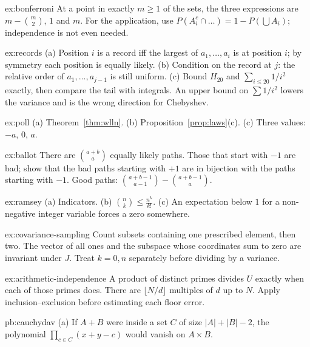 \begin{hint}{ex:bonferroni}
At a point in exactly $m\ge1$ of the sets, the three expressions are $m-\binom m2$, $1$ and $m$. For the application, use $P(A_i^c\cap\dots)=1-P(\bigcup A_i)$; independence is not even needed.
\end{hint}
\begin{hint}{ex:records}
(a) Position $i$ is a record iff the largest of $a_1,\dots,a_i$ is at position $i$; by symmetry each position is equally likely. (b) Condition on the record at $j$: the relative order of $a_1,\dots,a_{j-1}$ is still uniform. (c) Bound $H_{20}$ and $\sum_{i\le20}1/i^2$ exactly, then compare the tail with integrals. An upper bound on $\sum 1/i^2$ lowers the variance and is the wrong direction for Chebyshev.
\end{hint}
\begin{hint}{ex:poll}
(a) Theorem~\ref{thm:wlln}. (b) Proposition~\ref{prop:laws}(c). (c) Three values: $-a$, $0$, $a$.
\end{hint}
\begin{hint}{ex:ballot}
There are $\binom{a+b}a$ equally likely paths. Those that start with $-1$ are bad; show that the bad paths starting with $+1$ are in bijection with the paths starting with $-1$. Good paths: $\binom{a+b-1}{a-1}-\binom{a+b-1}{a}$.
\end{hint}
\begin{hint}{ex:ramsey}
(a) Indicators. (b) $\binom nk\le\frac{n^k}{k!}$. (c) An expectation below $1$ for a non-negative integer variable forces a zero somewhere.
\end{hint}

\begin{hint}{ex:covariance-sampling}
Count subsets containing one prescribed element, then two. The vector of all
ones and the subspace whose coordinates sum to zero are invariant under $J$.
Treat $k=0,n$ separately before dividing by a variance.
\end{hint}

\begin{hint}{ex:arithmetic-independence}
A product of distinct primes divides $U$ exactly when each of those primes does.
There are $\lfloor N/d\rfloor$ multiples of $d$ up to $N$. Apply
inclusion--exclusion before estimating each floor error.
\end{hint}

\begin{hint}{pb:cauchydav}
(a) If $A+B$ were inside a set $C$ of size $|A|+|B|-2$, the polynomial $\prod_{c\in C}(x+y-c)$ would vanish on $A\times B$.
\end{hint}

